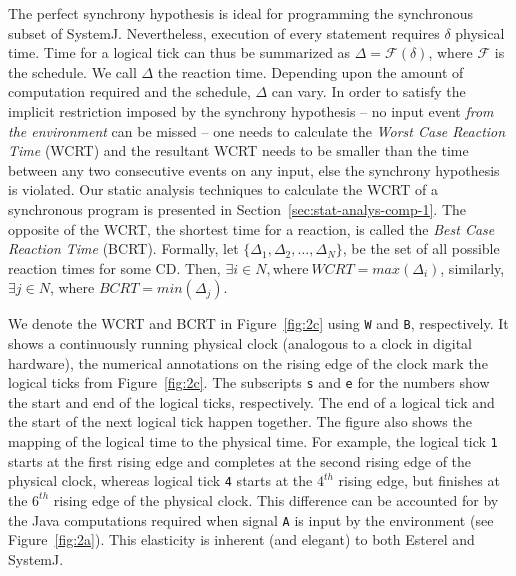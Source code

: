 The perfect synchrony hypothesis is ideal for programming the
synchronous subset of SystemJ. Nevertheless, execution of every
statement requires $\delta$ physical time. Time for a logical tick can
thus be summarized as $\Delta = \mathcal{F} (\delta)$, where
$\mathcal{F}$ is the schedule. We call $\Delta$ the reaction
time. Depending upon the amount of computation required and the
schedule, $\Delta$ can vary. In order to satisfy the implicit
restriction imposed by the synchrony hypothesis -- no input event
\textit{from the environment} can be missed -- one needs to calculate
the \textit{Worst Case Reaction Time} (WCRT) and the resultant WCRT
needs to be smaller than the time between any two consecutive events on
any input, else the synchrony hypothesis is violated. Our static
analysis techniques to calculate the WCRT of a synchronous program is
presented in Section~\ref{sec:stat-analys-comp-1}. The opposite of the
WCRT, the shortest time for a reaction, is called the \textit{Best Case
  Reaction Time} (BCRT). Formally, let $\{\Delta_1, \Delta_2,\ldots,
\Delta_N\}$, be the set of all possible reaction times for some
CD. Then, $\exists i \in N, \mathrm{where\ } WCRT= max (\Delta_i)$,
similarly, $\exists j \in N$, where $BCRT = min (\Delta_j)$.


We denote the WCRT and BCRT in Figure~\ref{fig:2c} using \texttt{W} and
\texttt{B}, respectively. It shows a continuously running physical clock
(analogous to a clock in digital hardware), the numerical annotations on
the rising edge of the clock mark the logical ticks from
Figure~\ref{fig:2c}. The subscripts \texttt{s} and \texttt{e} for the
numbers show the start and end of the logical ticks, respectively. The
end of a logical tick and the start of the next logical tick happen
together. The figure also shows the mapping of the logical time to the
physical time. For example, the logical tick \texttt{1} starts at the
first rising edge and completes at the second rising edge of the
physical clock, whereas logical tick \texttt{4} starts at the $4^{th}$
rising edge, but finishes at the $6^{th}$ rising edge of the physical
clock. This difference can be accounted for by the Java computations
required when signal \texttt{A} is input by the environment (see
Figure~\ref{fig:2a}). This elasticity is inherent (and elegant) to both
Esterel and SystemJ.


